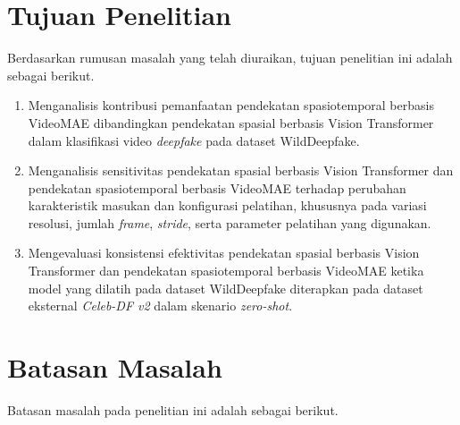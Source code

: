 \section{Tujuan Penelitian} \label{I.Tujuan}
Berdasarkan rumusan masalah yang telah diuraikan, tujuan penelitian ini adalah sebagai berikut. \par

\begin{enumerate}[noitemsep]
	\item Menganalisis kontribusi pemanfaatan pendekatan spasiotemporal berbasis VideoMAE dibandingkan pendekatan spasial berbasis Vision Transformer dalam klasifikasi video \textit{deepfake} pada dataset WildDeepfake.
	\item Menganalisis sensitivitas pendekatan spasial berbasis Vision Transformer dan pendekatan spasiotemporal berbasis VideoMAE terhadap perubahan karakteristik masukan dan konfigurasi pelatihan, khususnya pada variasi resolusi, jumlah \textit{frame}, \textit{stride}, serta parameter pelatihan yang digunakan.
	\item Mengevaluasi konsistensi efektivitas pendekatan spasial berbasis Vision Transformer dan pendekatan spasiotemporal berbasis VideoMAE ketika model yang dilatih pada dataset WildDeepfake diterapkan pada dataset eksternal \textit{Celeb-DF v2} dalam skenario \textit{zero-shot}.
\end{enumerate}

\section{Batasan Masalah} \label{I.Batasan}
Batasan masalah pada penelitian ini adalah sebagai berikut. \par

